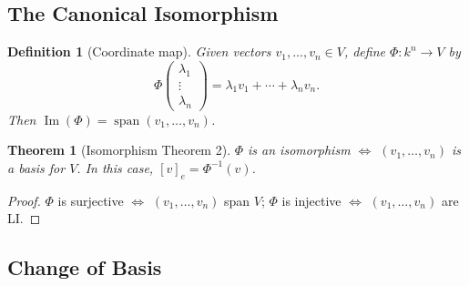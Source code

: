 \documentclass{article}
\newtheorem{theorem}{Theorem}
\newtheorem{definition}{Definition}
\newcommand{\Span}{\operatorname{span}}
\begin{document}
\subsection{The Canonical Isomorphism}
\begin{definition}[Coordinate map]
    Given vectors $v_1,\ldots,v_n\in V$, define $\Phi: k^n\to V$ by
    \[\Phi\begin{pmatrix}\lambda_1\\\vdots\\\lambda_n\end{pmatrix} = \lambda_1v_1+\cdots+\lambda_nv_n.\]
    Then $\operatorname{Im}(\Phi)=\Span(v_1,\ldots,v_n)$.
\end{definition}
\begin{theorem}[Isomorphism Theorem 2]
    $\Phi$ is an isomorphism $\iff$ $(v_1,\ldots,v_n)$ is a basis for $V$. In this case, $[v]_e = \Phi^{-1}(v)$.
\end{theorem}
\begin{proof}
    $\Phi$ is surjective $\iff$ $(v_1,\ldots,v_n)$ span $V$; $\Phi$ is injective $\iff$ $(v_1,\ldots,v_n)$ are LI.
\end{proof}

\subsection{Change of Basis}
\end{document}
